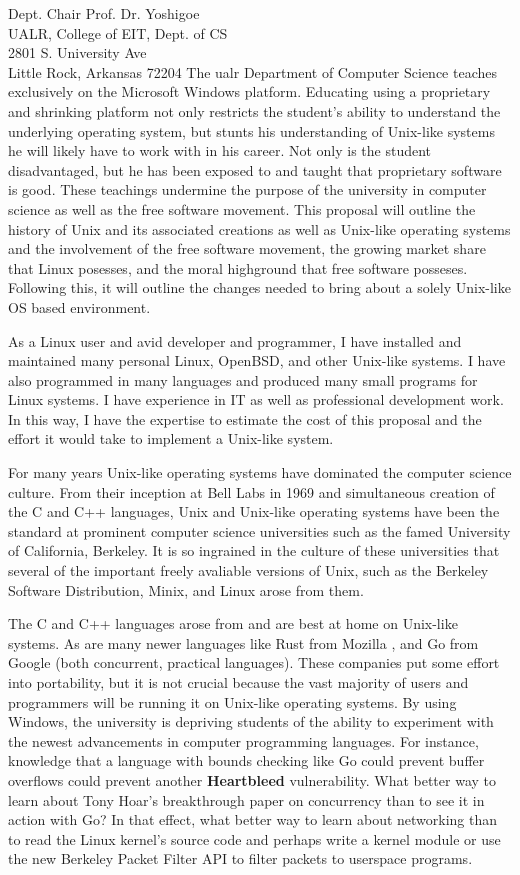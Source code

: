 \documentclass{letter}
\begin{document}
\begin{letter}{
    Dept. Chair Prof. Dr. Yoshigoe \\
    UALR, College of EIT, Dept. of CS \\
    2801 S. University Ave \\
    Little Rock, Arkansas 72204
  }
    The \gls{ualr} Department of Computer Science teaches exclusively on the Microsoft Windows platform. Educating using a proprietary and shrinking platform not only restricts the student's ability to understand the underlying operating system, but stunts his understanding of Unix-like systems he will likely have to work with in his career. Not only is the student disadvantaged, but he has been exposed to and taught that proprietary software is good. These teachings undermine the purpose of the university in computer science as well as the free software movement. This proposal will outline the history of Unix and its associated creations as well as Unix-like operating systems and the involvement of the free software movement, the growing market share that Linux posesses, and the moral highground that free software posseses. Following this, it will outline the changes needed to bring about a solely Unix-like OS based environment.

    As a Linux user and avid developer and programmer, I have installed and maintained many personal Linux, OpenBSD, and other Unix-like systems. I have also programmed in many languages and produced many small programs for Linux systems. I have experience in IT as well as professional development work. In this way, I have the expertise to estimate the cost of this proposal and the effort it would take to implement a Unix-like system.

    For many years Unix-like operating systems have dominated the computer science culture. From their inception at Bell Labs in 1969 and simultaneous creation of the C and C++ languages, Unix and Unix-like operating systems have been the standard at prominent computer science universities such as the famed University of California, Berkeley. It is so ingrained in the culture of these universities that several of the important freely avaliable versions of Unix, such as the Berkeley Software Distribution, Minix, and Linux arose from them.

    The C and C++ languages arose from and are best at home on Unix-like systems. As are many newer languages like Rust from Mozilla \cite{RustLang}, and Go from Google \cite{Golang} (both concurrent, practical languages). These companies put some effort into portability, but it is not crucial because the vast majority of users and programmers will be running it on Unix-like operating systems. By using Windows, the university is depriving students of the ability to experiment with the newest advancements in computer programming languages. For instance, knowledge that a language with bounds checking like Go could prevent buffer overflows could prevent another {\bf Heartbleed} vulnerability. What better way to learn about Tony Hoar's breakthrough paper on concurrency than to see it in action with Go? In that effect, what better way to learn about networking than to read the Linux kernel's source code and perhaps write a kernel module or use the new Berkeley Packet Filter API to filter packets to userspace programs.


\end{letter}
\end{document}
